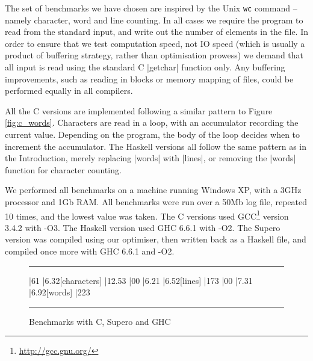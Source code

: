 \documentclass{llncs}
\newenvironment{fig}
    {\begin{figure}[tbp]\hrule}
    {\end{figure}}
\newcommand{\figend}{\hrule}
\begin{document}
The set of benchmarks we have chosen are inspired by the Unix \texttt{wc} command -- namely character, word and line counting. In all cases we require the program to read from the standard input, and write out the number of elements in the file. In order to ensure that we test computation speed, not IO speed (which is usually a product of buffering strategy, rather than optimisation prowess) we demand that all input is read using the standard C |getchar| function only. Any buffering improvements, such as reading in blocks or memory mapping of files, could be performed equally in all compilers.

All the C versions are implemented following a similar pattern to Figure \ref{fig:c_words}. Characters are read in a loop, with an accumulator recording the current value. Depending on the program, the body of the loop decides when to increment the accumulator. The Haskell versions all follow the same pattern as in the Introduction, merely replacing |words| with |lines|, or removing the |words| function for character counting.

We performed all benchmarks on a machine running Windows XP, with a 3GHz processor and 1Gb RAM. All benchmarks were run over a 50Mb log file, repeated 10 times, and the lowest value was taken. The C versions used GCC\footnote{\url{http://gcc.gnu.org/}} version 3.4.2 with -O3. The Haskell version used GHC \cite{ghc} 6.6.1 with -O2. The Supero version was compiled using our optimiser, then written back as a Haskell file, and compiled once more with GHC 6.6.1 and -O2.

\begin{fig}
\vspace{7mm}
\begin{barenv}
 
\bar{6}{1}
\bar{6.3}{2}[characters]
\bar{12.5}{3}
\bar{0}{0}
\bar{6.2}{1}
\bar{6.5}{2}[lines]
\bar{17}{3}
\bar{0}{0}
\bar{7.3}{1}
\bar{6.9}{2}[words]
\bar{22}{3}
\end{barenv}
\vspace{7mm}
\figend
\caption{Benchmarks with C, Supero and GHC}
\label{fig:c_results}
\end{fig}
\end{document}

